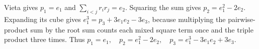 Vieta gives $p_1=e_1$ and $\sum_{i<j}r_ir_j=e_2$. Squaring the sum gives $p_2=e_1^2-2e_2$. Expanding its cube gives $e_1^3=p_3+3e_1e_2-3e_3$, because multiplying the pairwise-product sum by the root sum counts each mixed square term once and the triple product three times. Thus $\boxed{p_1=e_1,\quad p_2=e_1^2-2e_2,\quad p_3=e_1^3-3e_1e_2+3e_3}$.
